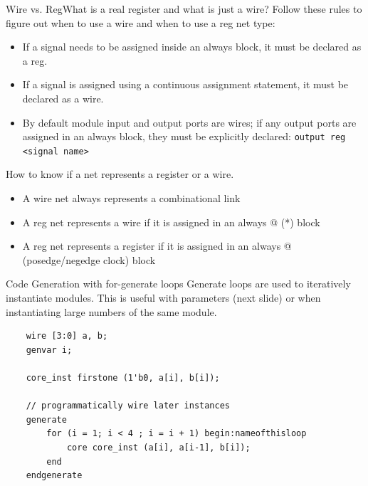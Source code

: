 \documentclass{beamer}
\begin{document}
\begin{frame}[fragile]{Wire vs. Reg}{What is a real register and what is just a wire?}
	Follow these rules to figure out when to use a wire and when to use a reg net type:
	\begin{itemize}
		\item If a signal needs to be assigned inside an always block, it must be declared as a reg.
		\item If a signal is assigned using a continuous assignment statement, it must be declared as a wire.
		\item By default module input and output ports are wires; if any output ports are assigned in an always block, they must be explicitly declared: \texttt{output reg <signal name>}
	\end{itemize}
	
	How to know if a net represents a register or a wire.
	\begin{itemize}
		\item A wire net always represents a combinational link
		\item A reg net represents a wire if it is assigned in an always @ (*) block
		\item A reg net represents a register if it is assigned in an always @ (posedge/negedge clock) block
	\end{itemize}
\end{frame}

\begin{frame}[fragile]{Code Generation with for-generate loops}
	Generate loops are used to iteratively instantiate modules.
	This is useful with parameters (next slide) or when instantiating large numbers of the same module.

	\begin{verbatim}
	wire [3:0] a, b;
	genvar i;

	core_inst firstone (1'b0, a[i], b[i]);

	// programmatically wire later instances
	generate
		for (i = 1; i < 4 ; i = i + 1) begin:nameofthisloop
			core core_inst (a[i], a[i-1], b[i]);
		end
	endgenerate
	\end{verbatim}

\end{frame}
\end{document}
